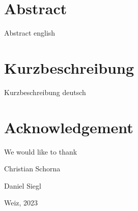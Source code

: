 \chapter*{Abstract}
Abstract english

\chapter*{Kurzbeschreibung}
Kurzbeschreibung deutsch

\chapter*{Acknowledgement}
We would like to thank

\vspace{2cm}
\begin{flushright}
    Christian Schorna
    \vspace{0.4cm}

    Daniel Siegl
    \vspace{0.4cm}

    Weiz, 2023
\end{flushright}